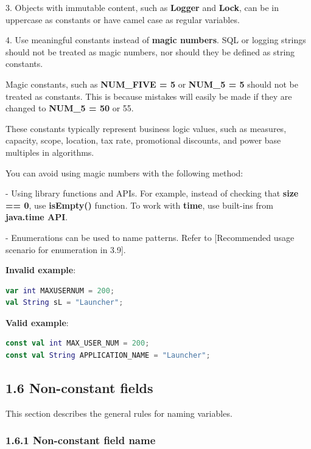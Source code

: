 {{{{3. Objects with immutable content, such as \textbf{Logger} and \textbf{Lock}, can be in uppercase as constants or have camel case as regular variables.

4. Use meaningful constants instead of \textbf{magic numbers}. SQL or logging strings should not be treated as magic numbers, nor should they be defined as string constants.

Magic constants, such as \textbf{NUM_FIVE = 5} or \textbf{NUM_5 = 5} should not be treated as constants. This is because mistakes will easily be made if they are changed to \textbf{NUM_5 = 50} or 55.

These constants typically represent business logic values, such as measures, capacity, scope, location, tax rate, promotional discounts, and power base multiples in algorithms.

You can avoid using magic numbers with the following method:

- Using library functions and APIs. For example, instead of checking that \textbf{size == 0}, use \textbf{isEmpty()} function. To work with \textbf{time}, use built-ins from \textbf{java.time API}.

- Enumerations can be used to name patterns. Refer to [Recommended usage scenario for enumeration in 3.9].



\textbf{Invalid example}: 



\begin{lstlisting}[language=Kotlin]
var int MAXUSERNUM = 200;
val String sL = "Launcher";
\end{lstlisting}


\textbf{Valid example}:



\begin{lstlisting}[language=Kotlin]
const val int MAX_USER_NUM = 200;
const val String APPLICATION_NAME = "Launcher";
\end{lstlisting}


\subsection*{\textbf{1.6 Non-constant fields}}

\label{sec:1.6}

This section describes the general rules for naming variables.

\subsubsection*{\textbf{1.6.1 Non-constant field name}}
\leavevmode\newline

}}}}

